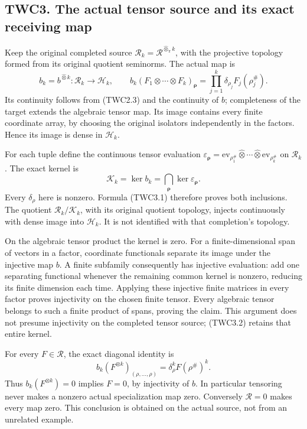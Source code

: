 \subsection{TWC3. The actual tensor source and its exact receiving
map}\label{twc3.-the-actual-tensor-source-and-its-exact-receiving-map}

Keep the original completed source
\(\mathscr R_k=\mathcal R^{\widehat\otimes_\pi k}\), with the projective
topology formed from its original quotient seminorms. The actual map is
\[
b_k=b^{\widehat\otimes k}:\mathscr R_k\longrightarrow\mathscr H_k,
\qquad
b_k(F_1\otimes\cdots\otimes F_k)_{\boldsymbol\rho}
=\prod_{j=1}^k\delta_{\rho_j}F_j(\rho_j^\#).
\tag{TWC3.1}
\] Its continuity follows from (TWC2.3) and the continuity of \(b\);
completeness of the target extends the algebraic tensor map. Its image
contains every finite coordinate array, by choosing the original
isolators independently in the factors. Hence its image is dense in
\(\mathscr H_k\).

For each tuple define the continuous tensor evaluation
\(\varepsilon_{\boldsymbol\rho}=\mathrm{ev}_{\rho_1^\#}\widehat\otimes\cdots\widehat\otimes\mathrm{ev}_{\rho_k^\#}\)
on \(\mathscr R_k\). The exact kernel is \[
\mathscr K_k=\ker b_k=\bigcap_{\boldsymbol\rho}\ker\varepsilon_{\boldsymbol\rho}.
\tag{TWC3.2}
\] Every \(\delta_\rho\) here is nonzero. Formula (TWC3.1) therefore
proves both inclusions. The quotient \(\mathscr R_k/\mathscr K_k\), with
its original quotient topology, injects continuously with dense image
into \(\mathscr H_k\). It is not identified with that completion's
topology.

On the algebraic tensor product the kernel is zero. For a
finite-dimensional span of vectors in a factor, coordinate functionals
separate its image under the injective map \(b\). A finite subfamily
consequently has injective evaluation: add one separating functional
whenever the remaining common kernel is nonzero, reducing its finite
dimension each time. Applying these injective finite matrices in every
factor proves injectivity on the chosen finite tensor. Every algebraic
tensor belongs to such a finite product of spans, proving the claim.
This argument does not presume injectivity on the completed tensor
source; (TWC3.2) retains that entire kernel.

For every \(F\in\mathcal R\), the exact diagonal identity is \[
b_k(F^{\otimes k})_{(\rho,\ldots,\rho)}
=\delta_\rho^k F(\rho^\#)^k.
\tag{TWC3.3}
\] Thus \(b_k(F^{\otimes k})=0\) implies \(F=0\), by injectivity of
\(b\). In particular tensoring never makes a nonzero actual
specialization map zero. Conversely \(\mathcal R=0\) makes every map
zero. This conclusion is obtained on the actual source, not from an
unrelated example.

